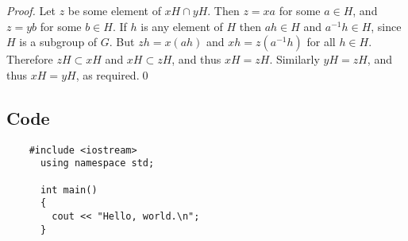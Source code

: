 \begin{proof}
Let $z$ be some element of $xH \cap yH$.  Then $z = xa$
for some $a \in H$, and $z = yb$ for some $b \in H$.
If $h$ is any element of $H$ then $ah \in H$ and
$a^{-1}h \in H$, since $H$ is a subgroup of $G$.
But $zh = x(ah)$ and $xh = z(a^{-1}h)$ for all $h \in H$.
Therefore $zH \subset xH$ and $xH \subset zH$, and thus
$xH = zH$.  Similarly $yH = zH$, and thus $xH = yH$,
as required.\qed
\end{proof}

\subsection{Code}
\begin{verbatim}
	#include <iostream>
	  using namespace std;

	  int main()                       
	  {                            
	    cout << "Hello, world.\n"; 
	  }
\end{verbatim}
